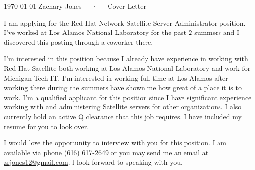 \documentclass[11pt, letterpaper]{awesome-cv}
\begin{document}
\makecvheader[R]

\makecvfooter
  {\today}
  {Zachary Jones~~~·~~~Cover Letter}
  {}

\makelettertitle

\begin{cvletter}

I am applying for the Red Hat Network Satellite Server Administrator position. I’ve worked at Los Alamos National Laboratory for the past 2 summers and I discovered this posting through a coworker there.

I’m interested in this position because I already have experience in working with Red Hat Satellite both working at Los Alamos National Laboratory and work for Michigan Tech IT. I’m interested in working full time at Los Alamos after working there during the summers have shown me how great of a place it is to work. I’m a qualified applicant for this position since I have significant experience working with and administering Satellite servers for other organizations. I also currently hold an active Q clearance that this job requires. I have included my resume for you to look over.

I would love the opportunity to interview with you for this position. I am available via phone (616) 617-2649 or you may send me an email at \href{mailto:zrjones12@gmail.com}{zrjones12@gmail.com}. I look forward to speaking with you.

\end{cvletter}


\makeletterclosing
\end{document}
